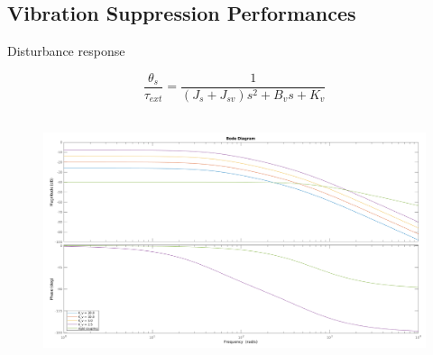 \documentclass[10pt]{beamer}
\begin{document}
\subsection*{Vibration Suppression Performances}
\begin{frame}{Disturbance response}
	
  \begin{equation*}
    \dfrac{\theta_s}{\tau_{ext}} = \dfrac{1}{(J_s + J_{sv}) s^2 + B_v s + K_v}
  \end{equation*}\\
  \begin{figure}
  	\centering
  	\includegraphics[width=1\linewidth]{../reportTeleop/Images/bodo}
  \end{figure}
  

\end{frame}
\end{document}
